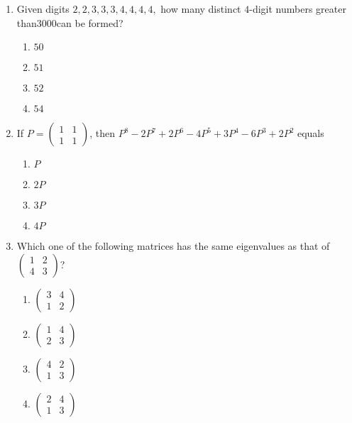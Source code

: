 \documentclass[journal,12pt,onecolumn]{IEEEtran}
\theoremstyle{remark}
\begin{document}
\begin{enumerate}
\item Given digits $2, 2, 3, 3, 3, 4, 4, 4, 4,$ how many distinct $4$-digit numbers greater than$ 3000 $can be formed?
\begin{enumerate}
    \item $50$
    \item $51$
    \item $52$
    \item $54$
\end{enumerate}
\item If $P = \begin{pmatrix} 1 & 1 \\ 1 & 1 \end{pmatrix}$, then $P^8 - 2P^7 + 2P^6 - 4P^5 + 3P^4 - 6P^3 + 2P^2$ equals
\begin{enumerate}
    \item $P$
    \item $2P$
    \item $3P$
    \item $4P$
\end{enumerate}

\item Which one of the following matrices has the same eigenvalues as that of $\begin{pmatrix} 1 & 2 \\ 4 & 3 \end{pmatrix}$?
\begin{enumerate}
    \item $\begin{pmatrix} 3 & 4 \\ 1 & 2 \end{pmatrix}$
    \item $\begin{pmatrix} 1 & 4 \\ 2 & 3 \end{pmatrix}$
    \item $\begin{pmatrix} 4 & 2 \\ 1 & 3 \end{pmatrix}$
    \item $\begin{pmatrix} 2 & 4 \\ 1 & 3 \end{pmatrix}$
\end{enumerate}

\end{enumerate}
\end{document}
